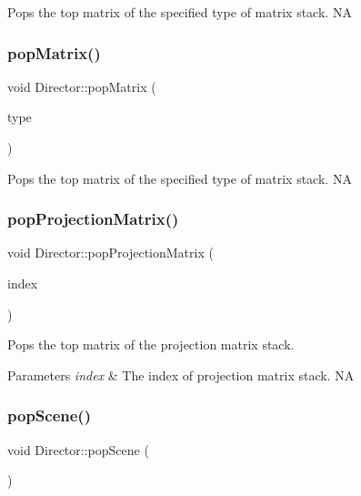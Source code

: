 Pops the top matrix of the specified type of matrix stack.  NA \mbox{\label{classDirector_a4c47574ac63626fa0e14eee27fed8b99}} 
\subsubsection{\texorpdfstring{pop\+Matrix()}{popMatrix()}\hspace{0.1cm}{\footnotesize\ttfamily [2/2]}}
{\footnotesize\ttfamily void Director\+::pop\+Matrix (\begin{DoxyParamCaption}\item[{\hyperlink{group__base_ga4d146cef7130a8f3a953d46964ea3905}{M\+A\+T\+R\+I\+X\+\_\+\+S\+T\+A\+C\+K\+\_\+\+T\+Y\+PE}}]{type }\end{DoxyParamCaption})}

Pops the top matrix of the specified type of matrix stack.  NA \mbox{\label{classDirector_a116deb880d80374176070cac631a6fa2}} 
\subsubsection{\texorpdfstring{pop\+Projection\+Matrix()}{popProjectionMatrix()}}
{\footnotesize\ttfamily void Director\+::pop\+Projection\+Matrix (\begin{DoxyParamCaption}\item[{size\+\_\+t}]{index }\end{DoxyParamCaption})}

Pops the top matrix of the projection matrix stack. 
\begin{DoxyParams}{Parameters}
{\em index} & The index of projection matrix stack.  NA \\
\hline
\end{DoxyParams}
\mbox{\label{classDirector_a92916c5c47d0f0a202fe1a5023841e8b}} 
\subsubsection{\texorpdfstring{pop\+Scene()}{popScene()}\hspace{0.1cm}{\footnotesize\ttfamily [1/2]}}
{\footnotesize\ttfamily void Director\+::pop\+Scene (\begin{DoxyParamCaption}\item[{void}]{ }\end{DoxyParamCaption})}

